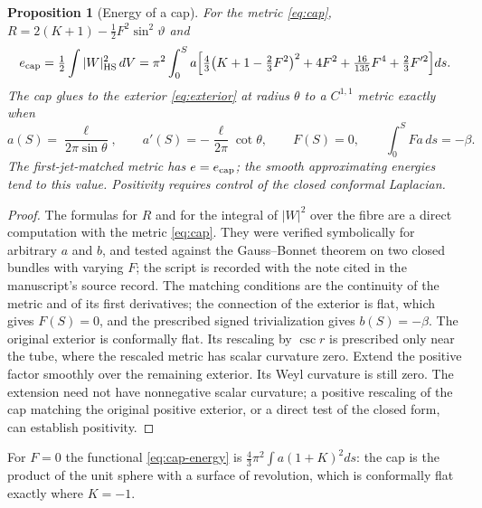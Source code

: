 \documentclass[11pt,letterpaper]{article}
\numberwithin{equation}{section}
\newtheorem{proposition}[theorem]{Proposition}
\theoremstyle{definition}
\begin{document}
\begin{proposition}[Energy of a cap]\label{prop:cap}
For the metric \eqref{eq:cap},
\(R=2(K+1)-\tfrac12F^2\sin^2\vartheta\) and
\begin{equation}\label{eq:cap-energy}
 e_{\rm cap}=\tfrac12\int|W|^2_{\rm HS}\,dV
 =\pi^2\int_0^Sa\Bigl[\tfrac43\bigl(K+1-\tfrac23F^2\bigr)^2+4F^2
 +\tfrac{16}{135}F^4+\tfrac23F'^2\Bigr]ds .
\end{equation}
The cap glues to the exterior \eqref{eq:exterior} at radius \(\theta\) to a
\(C^{1,1}\) metric exactly when
\[
 a(S)=\frac{\ell}{2\pi\sin\theta},\qquad a'(S)=-\frac{\ell}{2\pi}\cot\theta,
 \qquad F(S)=0,\qquad\int_0^SFa\,ds=-\beta .
\]
The first-jet-matched metric has \(e=e_{\rm cap}\); the smooth
approximating energies tend to this value. Positivity requires control
of the closed conformal Laplacian.
\end{proposition}
\begin{proof}
The formulas for \(R\) and for the integral of \(|W|^2\) over the fibre
are a direct computation with the metric \eqref{eq:cap}. They were
verified symbolically for arbitrary \(a\) and \(b\), and tested against
the Gauss--Bonnet theorem on two closed bundles with varying \(F\); the
script is recorded with the note cited in the manuscript's source record.
The matching conditions are the continuity of the metric and of its first
derivatives; the connection of the exterior is flat, which gives
\(F(S)=0\), and the prescribed signed trivialization gives \(b(S)=-\beta\).
The original exterior is conformally flat. Its rescaling by \(\csc r\)
is prescribed only near the tube, where the rescaled metric has scalar
curvature zero. Extend the positive factor smoothly over the remaining
exterior. Its Weyl curvature is still zero. The extension need not have
nonnegative scalar curvature; a positive rescaling of the cap matching
the original positive exterior, or a direct test of the closed form,
can establish positivity.
\end{proof}

For \(F=0\) the functional \eqref{eq:cap-energy} is
\(\tfrac43\pi^2\int a(1+K)^2ds\): the cap is the product of the unit
sphere with a surface of revolution, which is conformally flat exactly
where \(K=-1\).
\end{document}
